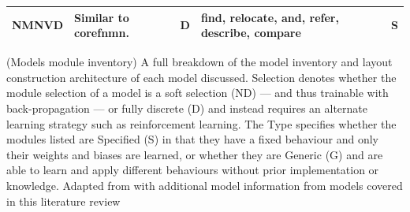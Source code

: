 \begin{table}[]
\begin{tabularx}{\linewidth}{cXcXc}
    NMNVD & Similar to \gls{corefnmn}. & D & find, relocate, and, refer, describe, compare & S  \\ \bottomrule
\end{tabularx}
\captionsource(Models module inventory)
    {A full breakdown of the model inventory and layout construction architecture of each model discussed. Selection denotes whether the module selection of a model is a soft selection (ND) --- and thus trainable with back-propagation --- or fully discrete (D) and instead requires an alternate learning strategy such as reinforcement learning. The Type specifies whether the modules listed are Specified (S) in that they have a fixed behaviour and only their weights and biases are learned, or whether they are Generic (G) and are able to learn and apply different behaviours without prior implementation or knowledge.\label{tab:models_module_inventory}}
    {Adapted from \citeauthor{fishandi_neural_2023}\cite{fishandi_neural_2023} with additional model information from models covered in this literature review}
\end{table}
